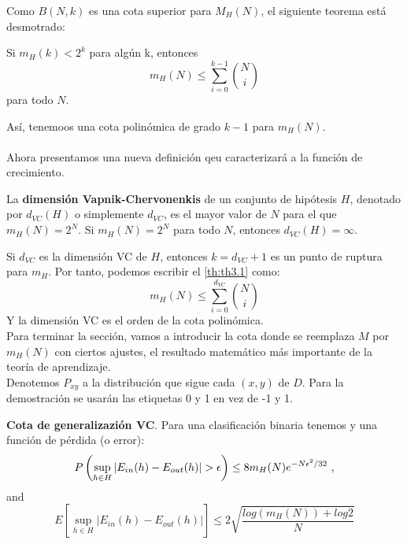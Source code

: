 Como $B(N,k)$ es una cota superior para $M_{H}(N)$, el siguiente teorema está desmotrado:
\begin{teorema}\label{th:th3.1}
Si $m_{H}(k)<2^{k}$ para algún k, entonces
\[ m_{H}(N) \leq \sum_{i=0}^{k-1} \binom{N}{i} \]
para todo $N$.
\end{teorema}
Así, tenemoos una cota polinómica de grado $k-1$ para $m_{H}(N)$.\cite{abu2012learning}\\\\
Ahora presentamos una nueva definición qeu caracterizará a la función de crecimiento.
\begin{definicion}
La \textbf{dimensión Vapnik-Chervonenkis} de un conjunto de hipótesis $H$, denotado por $d_{VC}(H)$ o simplemente $d_{VC}$, es el mayor valor de $N$ para el que $m_{H}(N)=2^{N}$. Si $m_{H}(N)=2^{N}$ para todo $N$, entonces $d_{VC}(H)=\infty$.
\end{definicion}
Si $d_{VC}$ es la dimensión VC de $H$, entonces $k=d_{VC}+1$ es un punto de ruptura para $m_{H}$. Por tanto, podemos escribir el \autoref{th:th3.1} como:
\[  m_{H}(N) \leq \sum_{i=0}^{d_{VC}} \binom{N}{i} \]
Y la dimensión VC es el orden de la cota polinómica.\\
Para terminar la sección, vamos a introducir la cota donde se reemplaza $M$ por $m_{H}(N)$ con ciertos ajustes, el resultado matemático más importante de la teoría de aprendizaje. \cite{abu2012learning}\\
Denotemos $P_{xy}$ a la distribución que sigue cada $(x,y)$ de $D$. Para la demostración se usarán las etiquetas 0 y 1 en vez de -1 y 1.
\begin{teorema}
\textbf{Cota de generalizazión VC}. Para una clasificación binaria tenemos y una función de pérdida (o error):
\[ P \left( \sup_{h \in H} \vert E_{in}(h)-E_{out}(h) \vert > \epsilon \right) \leq 8m_{H}(N)e^{-N \epsilon^{2}/32} \textnormal{ ,} \]
and
\[ E \left[ \sup_{h \in H} \vert E_{in}(h)-E_{out}(h) \vert \right] \leq 2 \sqrt{\frac{log(m_{H}(N))+log2}{N}} \]
\end{teorema}
